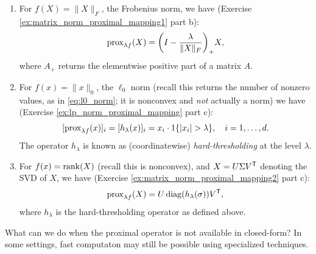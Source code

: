 \begin{Example}
\begin{enumerate}[label=\alph*., ref=\alph*]
\item {}  
  For $f(X) = \|X\|_F$, the Frobenius norm, we have (Exercise
  \ref{ex:matrix_norm_proximal_mapping1} part b):    
  \[
  \operatorname{prox}_{\lambda f}(X) = \bigg(I - \frac{\lambda}{\|X\|_F} \bigg)_+ X,
  \] 
  where $A_+$ returns the elementwise positive part of a matrix $A$. 

\item {}   
  For $f(x) = \|x\|_0$, the $\ell_0$ norm (recall this returns the number of
  nonzero values, as in \eqref{eq:l0_norm}; it is nonconvex and \emph{not}  
  actually a norm) we have (Exercise \ref{ex:lp_norm_proximal_mapping} part c):   
  \[
  [\operatorname{prox}_{\lambda f}(x)]_i = [h_\lambda(x)]_i 
  = x_i \cdot 1\{|x_i| > \lambda\}, \quad i = 1,\dots,d.
  \]  
  The operator $h_\lambda$ is known as (coordinatewise) \emph{hard-thresholding}
  at the level $\lambda$. 

\item {}    
  For $f(x) = \operatorname{rank}(X)$ (recall this is nonconvex), and $X = U \Sigma V^{\mathsf{T}}$
  denoting the SVD of $X$, we have (Exercise
  \ref{ex:matrix_norm_proximal_mapping2} part c):  
  \[
  \operatorname{prox}_{\lambda f}(X) = U \operatorname{diag}(h_\lambda(\sigma)) V^{\mathsf{T}},
  \]
  where $h_\lambda$ is the hard-thresholding operator as defined above.
\end{enumerate}
\end{Example}

What can we do when the proximal operator is not available in closed-form? In
some settings, fast computaton may still be possible using specialized
techniques.  

